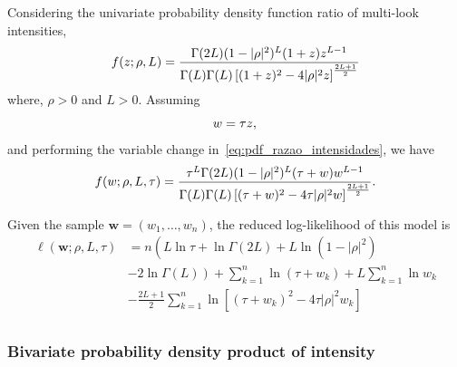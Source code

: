 \documentclass[journal]{IEEEtran}
\begin{document}
Considering the univariate probability density function ratio of multi-look intensities,
\begin{equation}\label{eq:pdf_razao_intensidades}
	f(z;\rho,L)=\frac{\Gamma(2L)(1-|\rho|^2)^{L}(1+z)z^{L-1}}{\Gamma(L)\Gamma(L)\left[(1+z)^2-4|\rho|^2z \right]^{\frac{2L+1}{2}}}\\
\end{equation}
where, $\rho>0$ and $L>0$.  Assuming
\begin{equation}\label{eq:razao_intensidades_w}
 w=\tau z,\\ 
\end{equation} 
and performing the variable change in~\eqref{eq:pdf_razao_intensidades}, we have 
\begin{equation}\label{eq:pdf_razao_intensidades_tau_w}
	f(w;\rho,L,\tau)=\frac{\tau^L\Gamma(2L)(1-|\rho|^2)^{L}(\tau+w)w^{L-1}}{\Gamma(L)\Gamma(L)\left[(\tau+w)^2-4\tau|\rho|^2w \right]^{\frac{2L+1}{2}}}.\\
\end{equation}

Given the sample $\bm w = (w_1,\dots,w_n)$, the reduced log-likelihood of this model is 
\begin{equation}\label{eq_log_vero_razao_intensidade_red_tau_w}
\begin{split}
    \ell(\bm w;\rho, L, \tau)&=n\left(L\ln\tau +\ln\Gamma(2L)+L\ln(1-|\rho|^2)\right.\\
                         &-\left.2\ln\Gamma(L)\right) +\sum_{k=1}^{n}\ln(\tau+w_k)+L\sum_{k=1}^{n}\ln w_k\\
                         &-\frac{2L+1}{2}\sum_{k=1}^{n} \ln\left[(\tau+w_k)^2-4\tau|\rho|^2w_k\right]\\
\end{split}
 \end{equation} 
%
\subsubsection{Bivariate probability density product of intensity} 
\end{document}
